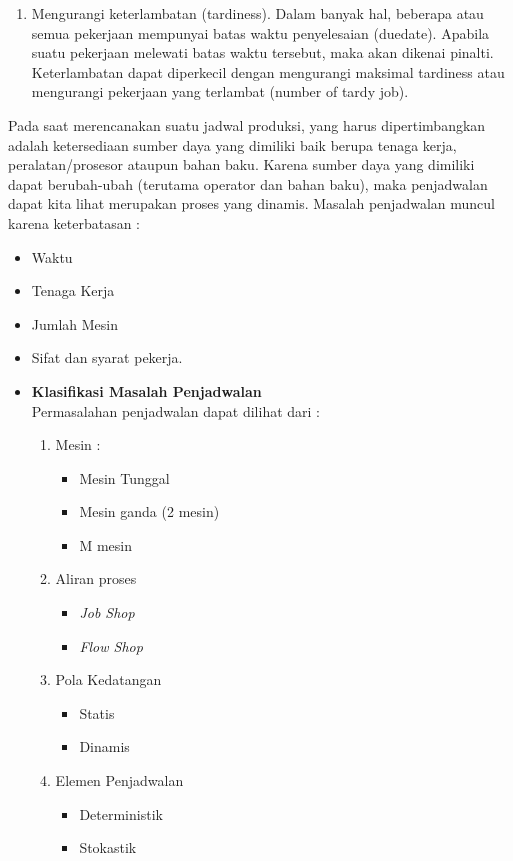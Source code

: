 \documentclass[a4paper,twoside]{article}
\begin{document}
\begin{enumerate}
\begin{itemize}
\begin{enumerate}
		\item Mengurangi keterlambatan (tardiness). Dalam banyak hal, beberapa atau semua pekerjaan mempunyai batas waktu penyelesaian (duedate). Apabila suatu pekerjaan melewati batas waktu tersebut, maka akan dikenai pinalti. Keterlambatan dapat diperkecil dengan mengurangi maksimal tardiness atau mengurangi pekerjaan yang terlambat (number of  tardy job).
		\end{enumerate}
		Pada saat merencanakan suatu jadwal produksi, yang harus dipertimbangkan adalah ketersediaan sumber daya yang dimiliki baik berupa tenaga kerja, peralatan/prosesor ataupun bahan baku. Karena sumber daya yang dimiliki dapat berubah-ubah (terutama operator dan bahan baku), maka penjadwalan dapat kita lihat merupakan proses yang dinamis.
		Masalah penjadwalan muncul karena keterbatasan : 
		\begin{itemize}
		\item Waktu
		\item Tenaga Kerja
		\item Jumlah Mesin
		\item Sifat dan syarat pekerja.
		\end{itemize}
		\end{itemize}
		
		\begin{itemize}
		\item {\bf Klasifikasi Masalah Penjadwalan}\\
		Permasalahan penjadwalan dapat dilihat dari : 
		\begin{enumerate}
		\item Mesin :
		\begin{itemize}
		\item Mesin Tunggal
		\item Mesin ganda (2 mesin)
		\item M mesin
		\end{itemize}
		\item Aliran proses
		\begin{itemize}
		\item {\it Job Shop}
		\item {\it Flow Shop}
		\end{itemize}
		\item Pola Kedatangan
		\begin{itemize}
		\item Statis
		\item Dinamis
		\end{itemize}
		\item Elemen Penjadwalan
		\begin{itemize}
		\item Deterministik
		\item Stokastik
		\end{itemize}
		\end{enumerate}
		

\end{itemize}
\end{enumerate}
\end{document}
